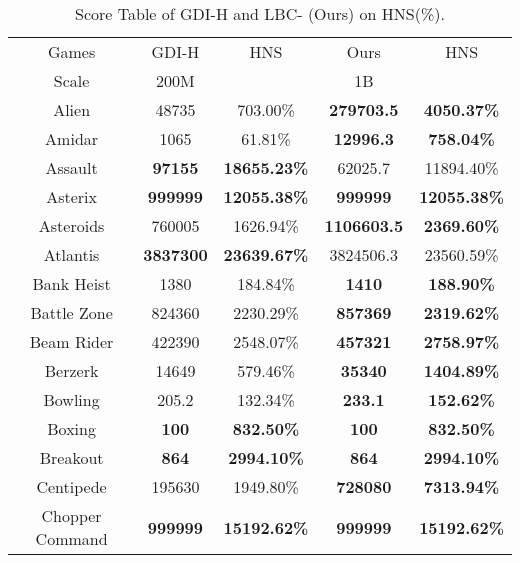 \clearpage  




\begin{table}[!hb]
\footnotesize
\begin{center}
\caption{Score Table of GDI-H and LBC- (Ours) on HNS(\%).}
\label{Tab:Score table of GDI and LBC on HNS.}
\setlength{\tabcolsep}{1.0pt}
\begin{tabular}{c cc cc }
\toprule
Games & GDI-H & HNS & Ours & HNS   \\ 
        Scale & 200M & ~ & 1B &    \\  \midrule
        Alien & 48735	             &703.00\% & \textbf{279703.5} & \textbf{4050.37\%} \\  
        Amidar &1065              &61.81\% & \textbf{12996.3} & \textbf{758.04\%} \\  
        Assault &\textbf{97155}	             &\textbf{18655.23\%}  & 62025.7 & 11894.40\% \\  
        Asterix &\textbf{{999999}}   &\textbf{{12055.38\%}} & \textbf{999999} & \textbf{12055.38\%} \\  
        Asteroids &{760005}            &{1626.94\%}  & \textbf{1106603.5} & \textbf{2369.60\%} \\  
        Atlantis &\textbf{{3837300}}           &\textbf{{23639.67\%}}   & 3824506.3 & 23560.59\% \\  
        Bank Heist &1380              &184.84\%  & \textbf{1410} & \textbf{188.90\%} \\  
        Battle Zone &824360            &2230.29\% & \textbf{857369} & \textbf{2319.62\%} \\  
        Beam Rider &422390            &2548.07\% & \textbf{457321} & \textbf{2758.97\%} \\  
        Berzerk &14649             &579.46\% & \textbf{35340} & \textbf{1404.89\%} \\  
        Bowling &205.2             &132.34\% & \textbf{233.1} & \textbf{152.62\%} \\  
        Boxing &\textbf{{100}}      &\textbf{{832.50\%}}   & \textbf{100} & \textbf{832.50\%} \\  
        Breakout &\textbf{{864}}      &\textbf{{2994.10\%}} & \textbf{864} & \textbf{2994.10\%} \\  
        Centipede &195630            &1949.80\% & \textbf{728080} & \textbf{7313.94\%} \\  
        Chopper Command &\textbf{{999999}}   &\textbf{{15192.62\%}} & \textbf{999999} & \textbf{15192.62\%} \\  

\end{tabular}
\end{center}
\end{table}
